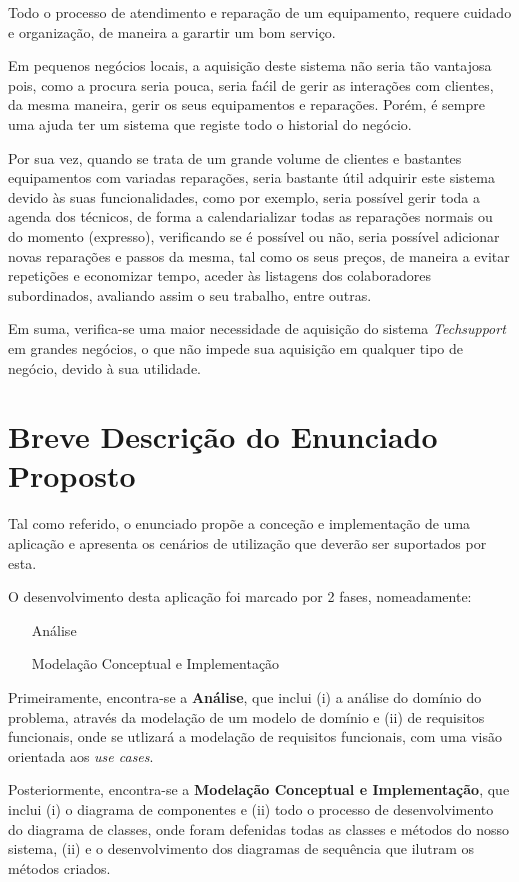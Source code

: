 \documentclass[a4paper,12pt]{scrreprt}
\begin{document}
Todo o processo de atendimento e reparação de um equipamento, requere cuidado e organização, de maneira a garartir um bom serviço.

Em pequenos negócios locais, a aquisição deste sistema não seria tão vantajosa pois, como a procura seria pouca, seria faćil
de gerir as interações com clientes, da mesma maneira, gerir os seus equipamentos e reparações. Porém, é sempre uma ajuda ter um sistema que
registe todo o historial do negócio.

Por sua vez, quando se trata de um grande volume de clientes e bastantes equipamentos com variadas reparações, seria bastante útil adquirir este sistema 
devido às suas funcionalidades, como por exemplo, seria possível gerir toda a agenda dos técnicos, de forma a calendarializar todas as reparações normais ou do momento (expresso), 
verificando se é possível ou não, seria possível adicionar novas reparações e passos da mesma, tal como os seus preços, de maneira a evitar repetições e economizar tempo, aceder 
às listagens dos colaboradores subordinados, avaliando assim o seu trabalho, entre outras.

Em suma, verifica-se uma maior necessidade de aquisição do sistema \textit{Techsupport} em grandes negócios, o que não impede sua aquisição em qualquer tipo de negócio, 
devido à sua utilidade.

\section{Breve Descrição do Enunciado Proposto}

Tal como referido, o enunciado propõe a conceção e implementação de uma aplicação e apresenta os cenários de utilização que deverão ser
suportados por esta.

O desenvolvimento desta aplicação foi marcado por 2 fases, nomeadamente:
\begin{itemize}
    \item [Análise]
    \item [Modelação Conceptual e Implementação]
\end{itemize}

Primeiramente, encontra-se a \textbf{Análise}, que inclui
(i) a análise do domínio do problema, através da modelação de um modelo de domínio e 
(ii) de requisitos funcionais, onde se utlizará a modelação de requisitos funcionais, com uma visão orientada aos \textit{use cases}.

Posteriormente, encontra-se a \textbf{Modelação Conceptual e Implementação}, que inclui
(i) o diagrama de componentes e 
(ii) todo o processo de desenvolvimento do diagrama de classes, onde foram defenidas todas as classes e métodos do nosso sistema,
(ii) e o desenvolvimento dos diagramas de sequência que ilutram os métodos criados.
\end{document}
